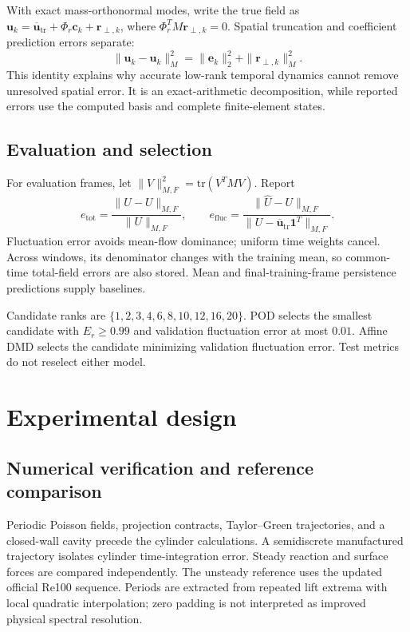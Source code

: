 \documentclass[11pt,a4paper]{article}
\begin{document}
With exact mass-orthonormal modes, write the true field as $\bm u_k=\overline{\bm u}_{\mathrm{tr}}+\Phi_r\bm c_k+\bm r_{\perp,k}$, where $\Phi_r^TM\bm r_{\perp,k}=0$. Spatial truncation and coefficient prediction errors separate:
\begin{equation}
 \|\widehat{\bm u}_k-\bm u_k\|_M^2
 =\|\bm e_k\|_2^2+\|\bm r_{\perp,k}\|_M^2.\label{eq:errorsplit}
\end{equation}
This identity explains why accurate low-rank temporal dynamics cannot remove unresolved spatial error. It is an exact-arithmetic decomposition, while reported errors use the computed basis and complete finite-element states.

\subsection{Evaluation and selection}
For evaluation frames, let $\|V\|_{M,F}^2=\mathrm{tr}(V^TMV)$. Report
\begin{equation}
 e_{\mathrm{tot}}=\frac{\|\widehat U-U\|_{M,F}}{\|U\|_{M,F}},\qquad
 e_{\mathrm{fluc}}=\frac{\|\widehat U-U\|_{M,F}}
 {\|U-\overline{\bm u}_{\mathrm{tr}}\bm1^T\|_{M,F}}.\label{eq:errors}
\end{equation}
Fluctuation error avoids mean-flow dominance; uniform time weights cancel. Across windows, its denominator changes with the training mean, so common-time total-field errors are also stored. Mean and final-training-frame persistence predictions supply baselines.

Candidate ranks are $\{1,2,3,4,6,8,10,12,16,20\}$. POD selects the smallest candidate with $E_r\geq0.99$ and validation fluctuation error at most $0.01$. Affine DMD selects the candidate minimizing validation fluctuation error. Test metrics do not reselect either model.

\section{Experimental design}
\subsection{Numerical verification and reference comparison}
Periodic Poisson fields, projection contracts, Taylor--Green trajectories, and a closed-wall cavity precede the cylinder calculations. A semidiscrete manufactured trajectory isolates cylinder time-integration error. Steady reaction and surface forces are compared independently. The unsteady reference uses the updated official Re100 sequence\cite{updated}. Periods are extracted from repeated lift extrema with local quadratic interpolation; zero padding is not interpreted as improved physical spectral resolution.
\end{document}

